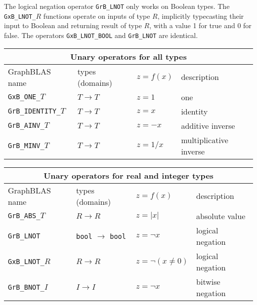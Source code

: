 \documentclass[12pt]{article}
\begin{document}
The logical negation operator \verb'GrB_LNOT' only works on Boolean types.  The
\verb'GxB_LNOT_'$R$ functions operate on inputs of type $R$, implicitly
typecasting their input to Boolean and returning result of type $R$, with a
value 1 for true and 0 for false.  The operators \verb'GxB_LNOT_BOOL' and
\verb'GrB_LNOT' are identical.

\vspace{0.2in}
{\footnotesize
\begin{tabular}{|llll|}
\hline
\multicolumn{4}{|c|}{Unary operators for all types} \\
\hline
GraphBLAS name          & types (domains)   & $z=f(x)$      & description \\
\hline
\verb'GxB_ONE_'$T$      & $T \rightarrow T$ & $z = 1$       & one \\
\verb'GrB_IDENTITY_'$T$ & $T \rightarrow T$ & $z = x$       & identity \\
\verb'GrB_AINV_'$T$     & $T \rightarrow T$ & $z = -x$      & additive inverse \\
\verb'GrB_MINV_'$T$     & $T \rightarrow T$ & $z = 1/x$     & multiplicative inverse \\
\hline
\end{tabular}

\vspace{0.2in}
\begin{tabular}{|llll|}
\hline
\multicolumn{4}{|c|}{Unary operators for real and integer types} \\
\hline
GraphBLAS name          & types (domains)   & $z=f(x)$      & description \\
\hline
\verb'GrB_ABS_'$T$      & $R \rightarrow R$ & $z = |x|$     & absolute value \\
\verb'GrB_LNOT'         & \verb'bool'
                          $\rightarrow$
                          \verb'bool'       & $z = \lnot x$ & logical negation \\
\verb'GxB_LNOT_'$R$     & $R \rightarrow R$ & $z = \lnot (x \ne 0)$ & logical negation \\
\verb'GrB_BNOT_'$I$     & $I \rightarrow I$ & $z = \lnot x$ & bitwise negation \\
\hline
\end{tabular}

}
\end{document}

